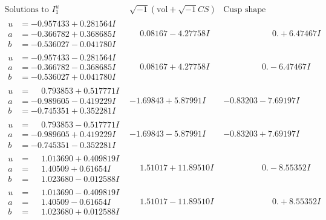 \documentclass[1p]{elsarticle_modified}
\theoremstyle{definition}
\newcommand{\I}{\sqrt{-1}}
\begin{document}
$$\begin{array}{c|c|c}  
\text{Solutions to }I^u_{1}& \I (\text{vol} + \sqrt{-1}CS) & \text{Cusp shape}\\
 \hline 
\begin{aligned}
u &= -0.957433 + 0.281564 I \\
a &= -0.366782 + 0.368685 I \\
b &= -0.536027 - 0.041780 I\end{aligned}
 & \phantom{-}0.08167 - 4.27758 I & \phantom{-0.000000 -}0. + 6.47467 I \\ \hline\begin{aligned}
u &= -0.957433 - 0.281564 I \\
a &= -0.366782 - 0.368685 I \\
b &= -0.536027 + 0.041780 I\end{aligned}
 & \phantom{-}0.08167 + 4.27758 I & \phantom{-0.000000 } 0. - 6.47467 I \\ \hline\begin{aligned}
u &= \phantom{-}0.793853 + 0.517771 I \\
a &= -0.989605 - 0.419229 I \\
b &= -0.745351 + 0.352281 I\end{aligned}
 & -1.69843 + 5.87991 I & -0.83203 - 7.69197 I \\ \hline\begin{aligned}
u &= \phantom{-}0.793853 - 0.517771 I \\
a &= -0.989605 + 0.419229 I \\
b &= -0.745351 - 0.352281 I\end{aligned}
 & -1.69843 - 5.87991 I & -0.83203 + 7.69197 I \\ \hline\begin{aligned}
u &= \phantom{-}1.013690 + 0.409819 I \\
a &= \phantom{-}1.40509 + 0.61654 I \\
b &= \phantom{-}1.023680 - 0.012588 I\end{aligned}
 & \phantom{-}1.51017 + 11.89510 I & \phantom{-0.000000 } 0. - 8.55352 I \\ \hline\begin{aligned}
u &= \phantom{-}1.013690 - 0.409819 I \\
a &= \phantom{-}1.40509 - 0.61654 I \\
b &= \phantom{-}1.023680 + 0.012588 I\end{aligned}
 & \phantom{-}1.51017 - 11.89510 I & \phantom{-0.000000 -}0. + 8.55352 I \\ \hline\begin{aligned}

\end{aligned}
\end{array}$$
\end{document}

